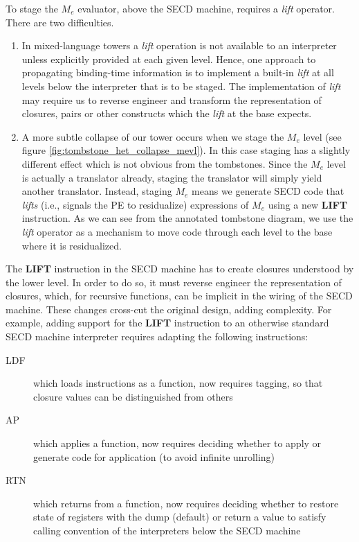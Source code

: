 \documentclass[sigplan,anonymous,review]{acmart}
\newcommand{\mevl}{$M_{e}$}
\theoremstyle{definition}
\begin{document}
To stage the \mevl{} evaluator, above the SECD machine, requires a \textit{lift} operator. There are two difficulties.
\begin{enumerate}
\item
In mixed-language towers a \textit{lift} operation is not available to an interpreter unless explicitly provided at each given level.
Hence, one approach to propagating binding-time information is to implement a built-in \textit{lift} at all levels below the interpreter that is to be staged. The implementation of \textit{lift} may require us to reverse engineer and transform the representation of closures, pairs or other constructs which the \textit{lift} at the base expects.

\item
A more subtle collapse of our tower occurs when we stage the \mevl{} level (see figure \ref{fig:tombstone_het_collapse_mevl}). In this case staging has a slightly different effect which is not obvious from the tombstones. Since the \mevl{} level is actually a translator already, staging the translator will simply yield another translator. Instead, staging \mevl{} means we generate SECD code that \textit{lifts} (i.e., signals the PE to residualize) expressions of \mevl{} using a new \textbf{LIFT} instruction. As we can see from the annotated tombstone diagram, we use the \textit{lift} operator as a mechanism to move code through each level to the base where it is residualized.
\end{enumerate}

The \textbf{LIFT} instruction in the SECD machine has to create
closures understood by the lower level. In order to do so, it must
reverse engineer the representation of closures, which, for recursive
functions, can be implicit in the wiring of the SECD machine. These changes cross-cut the original design, adding complexity.
For example, adding support for the \textbf{LIFT} instruction to an otherwise standard SECD machine interpreter
requires adapting the following instructions:
\begin{description}
\item [LDF] which loads instructions as a function, now requires tagging, so that closure values can be distinguished from others
\item [AP ] which applies a function, now requires deciding whether to apply or generate code for application (to avoid infinite unrolling)
\item [RTN] which returns from a function, now requires deciding whether to restore state of registers with the dump (default) or return a value to satisfy calling convention of the interpreters below the SECD machine
\end{description}
\end{document}
